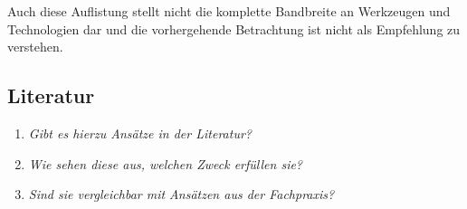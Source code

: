 Auch diese Auflistung stellt nicht die komplette Bandbreite an Werkzeugen und Technologien dar und die vorhergehende Betrachtung ist nicht als Empfehlung zu verstehen.

\subsection{Literatur}

\begin{enumerate}
	\item \textit{Gibt es hierzu Ansätze in der Literatur?}
	\item \textit{Wie sehen diese aus, welchen Zweck erfüllen sie?}
	\item \textit{Sind sie vergleichbar mit Ansätzen aus der Fachpraxis?}
\end{enumerate}